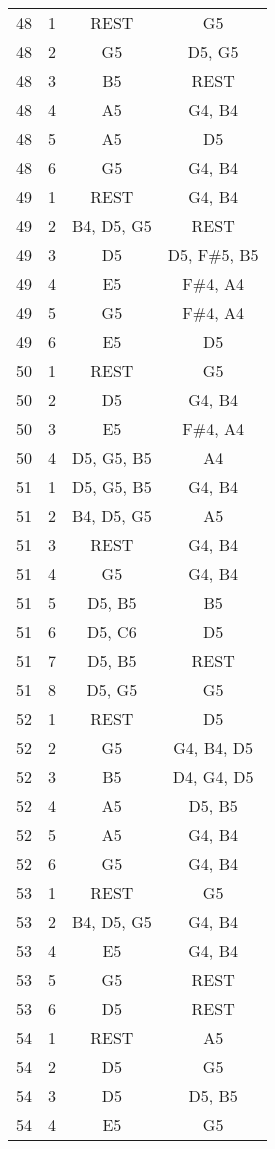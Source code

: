 \documentclass{article}
\begin{document}
\begin{longtable}{|c|c|c|c|}
\hline
48 & 1 & REST & G5 \\ 
48 & 2 & G5 & D5, G5 \\ 
48 & 3 & B5 & REST \\ 
48 & 4 & A5 & G4, B4 \\ 
48 & 5 & A5 & D5 \\ 
48 & 6 & G5 & G4, B4 \\ 
\hline
49 & 1 & REST & G4, B4 \\ 
49 & 2 & B4, D5, G5 & REST \\ 
49 & 3 & D5 & D5, F\#5, B5 \\ 
49 & 4 & E5 & F\#4, A4 \\ 
49 & 5 & G5 & F\#4, A4 \\ 
49 & 6 & E5 & D5 \\ 
\hline
50 & 1 & REST & G5 \\ 
50 & 2 & D5 & G4, B4 \\ 
50 & 3 & E5 & F\#4, A4 \\ 
50 & 4 & D5, G5, B5 & A4 \\ 
\hline
51 & 1 & D5, G5, B5 & G4, B4 \\ 
51 & 2 & B4, D5, G5 & A5 \\ 
51 & 3 & REST & G4, B4 \\ 
51 & 4 & G5 & G4, B4 \\ 
51 & 5 & D5, B5 & B5 \\ 
51 & 6 & D5, C6 & D5 \\ 
51 & 7 & D5, B5 & REST \\ 
51 & 8 & D5, G5 & G5 \\ 
\hline
52 & 1 & REST & D5 \\ 
52 & 2 & G5 & G4, B4, D5 \\ 
52 & 3 & B5 & D4, G4, D5 \\ 
52 & 4 & A5 & D5, B5 \\ 
52 & 5 & A5 & G4, B4 \\ 
52 & 6 & G5 & G4, B4 \\ 
\hline
53 & 1 & REST & G5 \\ 
53 & 2 & B4, D5, G5 & G4, B4 \\ 
53 & 4 & E5 & G4, B4 \\ 
53 & 5 & G5 & REST \\ 
53 & 6 & D5 & REST \\ 
\hline
54 & 1 & REST & A5 \\ 
54 & 2 & D5 & G5 \\ 
54 & 3 & D5 & D5, B5 \\ 
54 & 4 & E5 & G5 \\ 

\end{longtable}
\end{document}
